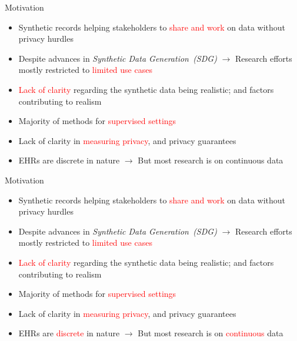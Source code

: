 \documentclass{beamer}
\begin{document}


\begin{frame}{Motivation}
\addtocounter{framenumber}{-1}

\begin{itemize}
  \item Synthetic records helping stakeholders to \textcolor{red}{share and work} on data without privacy hurdles
  \item Despite advances in \textit{Synthetic Data Generation~(SDG)} $\rightarrow$ Research efforts mostly restricted to \textcolor{red}{limited use cases}
  \item \textcolor{red}{Lack of clarity} regarding the synthetic data being realistic; and factors contributing to realism
  \item Majority of methods for \textcolor{red}{supervised settings}
  \item Lack of clarity in \textcolor{red}{measuring privacy}, and privacy guarantees
  \item \textcolor{mygray}{EHRs are discrete in nature $\rightarrow$ But most research is on continuous data}
  
  
  
\end{itemize}

\end{frame}



\begin{frame}{Motivation}
\addtocounter{framenumber}{-1}

\begin{itemize}
  \item Synthetic records helping stakeholders to \textcolor{red}{share and work} on data without privacy hurdles
  \item Despite advances in \textit{Synthetic Data Generation~(SDG)} $\rightarrow$ Research efforts mostly restricted to \textcolor{red}{limited use cases}
  \item \textcolor{red}{Lack of clarity} regarding the synthetic data being realistic; and factors contributing to realism
  \item Majority of methods for \textcolor{red}{supervised settings}
  \item Lack of clarity in \textcolor{red}{measuring privacy}, and privacy guarantees
  \item EHRs are \textcolor{red}{discrete} in nature $\rightarrow$ But most research is on \textcolor{red}{continuous} data
  
  
  
\end{itemize}

\end{frame}
\end{document}
